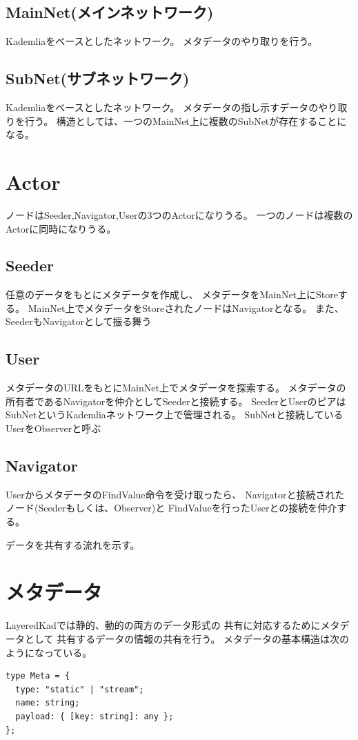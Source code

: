 \documentclass[sotsuron]{jcsie}
\begin{document}
\subsection{MainNet(メインネットワーク)}
Kademliaをベースとしたネットワーク。
メタデータのやり取りを行う。
\subsection{SubNet(サブネットワーク)}
Kademliaをベースとしたネットワーク。
メタデータの指し示すデータのやり取りを行う。
構造としては、一つのMainNet上に複数のSubNetが存在することになる。

\section{Actor}
ノードはSeeder,Navigator,Userの3つのActorになりうる。
一つのノードは複数のActorに同時になりうる。
\subsection{Seeder}
任意のデータをもとにメタデータを作成し、
メタデータをMainNet上にStoreする。
MainNet上でメタデータをStoreされたノードはNavigatorとなる。
また、SeederもNavigatorとして振る舞う
\subsection{User}
メタデータのURLをもとにMainNet上でメタデータを探索する。
メタデータの所有者であるNavigatorを仲介としてSeederと接続する。
SeederとUserのピアはSubNetというKademliaネットワーク上で管理される。
SubNetと接続しているUserをObserverと呼ぶ
\subsection{Navigator}
UserからメタデータのFindValue命令を受け取ったら、
Navigatorと接続されたノード(Seederもしくは、Observer)と
FindValueを行ったUserとの接続を仲介する。

データを共有する流れを示す。

\section{メタデータ}
LayeredKadでは静的、動的の両方のデータ形式の
共有に対応するためにメタデータとして
共有するデータの情報の共有を行う。
メタデータの基本構造は次のようになっている。
\begin{lstlisting}
type Meta = {
  type: "static" | "stream";
  name: string;
  payload: { [key: string]: any };
};
\end{lstlisting}
\end{document}
